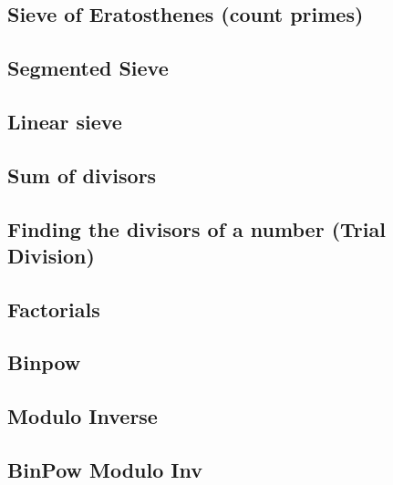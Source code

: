 \documentclass[10pt]{article}
\begin{document}
\begin{multicols*}{2}
\subsection{Sieve of Eratosthenes (count primes)}


\subsection{Segmented Sieve}


\subsection{Linear sieve}


\subsection{Sum of divisors}


\subsection{Finding the divisors of a number (Trial Division)}


\subsection{Factorials}


\subsection{Binpow}


\subsection{Modulo Inverse}


\subsection{BinPow Modulo Inv}



\end{multicols*}
\end{document}
